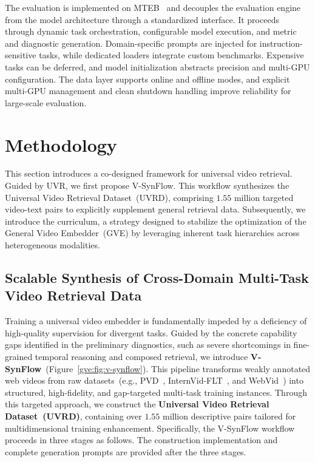 The evaluation is implemented on MTEB~\cite{muennighoff2022mteb} and decouples the evaluation engine from the model architecture through a standardized interface. It proceeds through dynamic task orchestration, configurable model execution, and metric and diagnostic generation. Domain-specific prompts are injected for instruction-sensitive tasks, while dedicated loaders integrate custom benchmarks. Expensive tasks can be deferred, and model initialization abstracts precision and multi-GPU configuration. The data layer supports online and offline modes, and explicit multi-GPU management and clean shutdown handling improve reliability for large-scale evaluation.


\section{Methodology}

This section introduces a co-designed framework for universal video retrieval. Guided by UVR, we first propose V-SynFlow. This workflow synthesizes the Universal Video Retrieval Dataset~(UVRD), comprising $1.55$ million targeted video-text pairs to explicitly supplement general retrieval data. Subsequently, we introduce the \pyramid curriculum, a strategy designed to stabilize the optimization of the General Video Embedder~(GVE) by leveraging inherent task hierarchies across heterogeneous modalities.

\subsection{Scalable Synthesis of Cross-Domain Multi-Task Video Retrieval Data}\label{gve:sec:data_synthesis}
Training a universal video embedder is fundamentally impeded by a deficiency of high-quality supervision for divergent tasks. Guided by the concrete capability gaps identified in the preliminary diagnostics, such as severe shortcomings in fine-grained temporal reasoning and composed retrieval, we introduce \textbf{V-SynFlow}~(Figure~\ref{gve:fig:v-synflow}). This pipeline transforms weakly annotated web videos from raw datasets~(e.g., PVD~\cite{bolya2025perception}, InternVid-FLT~\cite{wang2023internvid}, and WebVid~\cite{bain2021frozen}) into structured, high-fidelity, and gap-targeted multi-task training instances. Through this targeted approach, we construct the \textbf{Universal Video Retrieval Dataset~(UVRD)}, containing over $1.55$ million descriptive pairs tailored for multidimensional training enhancement.
Specifically, the V-SynFlow workflow proceeds in three stages as follows. The construction implementation and complete generation prompts are provided after the three stages.

